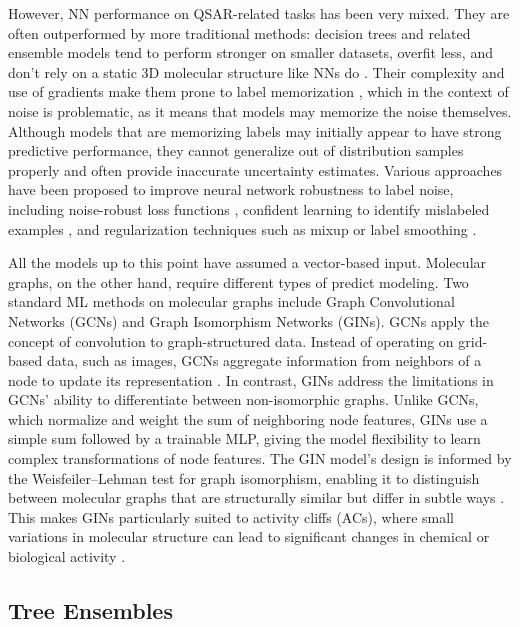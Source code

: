 However, NN performance on QSAR-related tasks has been very mixed. They are often outperformed by more traditional methods: decision trees and related ensemble models tend to perform stronger on smaller datasets, overfit less, and don't rely on a static 3D molecular structure like NNs do \citep{Baskin2008, Koutsoukas2017}. Their complexity and use of gradients make them prone to label memorization \citep{Zhang2017}, which in the context of noise is problematic, as it means that models may memorize the noise themselves. Although models that are memorizing labels may initially appear to have strong predictive performance, they cannot generalize out of distribution samples properly and often provide inaccurate uncertainty estimates. Various approaches have been proposed to improve neural network robustness to label noise, including noise-robust loss functions \citep{Zhang2017}, confident learning to identify mislabeled examples \citep{Northcutt2021}, and regularization techniques such as mixup or label smoothing \citep{Zhang2017}. 

All the models up to this point have assumed a vector-based input. Molecular graphs, on the other hand, require different types of predict modeling. Two standard ML methods on molecular graphs include Graph Convolutional Networks (GCNs) and Graph Isomorphism Networks (GINs). GCNs apply the concept of convolution to graph-structured data. Instead of operating on grid-based data, such as images, GCNs aggregate information from neighbors of a node to update its representation \citep{TeachOpenCADD2023, Xu2019}. In contrast, GINs address the limitations in GCNs’ ability to differentiate between non-isomorphic graphs. Unlike GCNs, which normalize and weight the sum of neighboring node features, GINs use a simple sum followed by a trainable MLP, giving the model flexibility to learn complex transformations of node features. The GIN model’s design is informed by the Weisfeiler--Lehman test for graph isomorphism, enabling it to distinguish between molecular graphs that are structurally similar but differ in subtle ways \citep{TeachOpenCADD2023, Xu2019}. This makes GINs particularly suited to activity cliffs (ACs), where small variations in molecular structure can lead to significant changes in chemical or biological activity \citep{TeachOpenCADD2023}. 


\subsection{Tree Ensembles}


